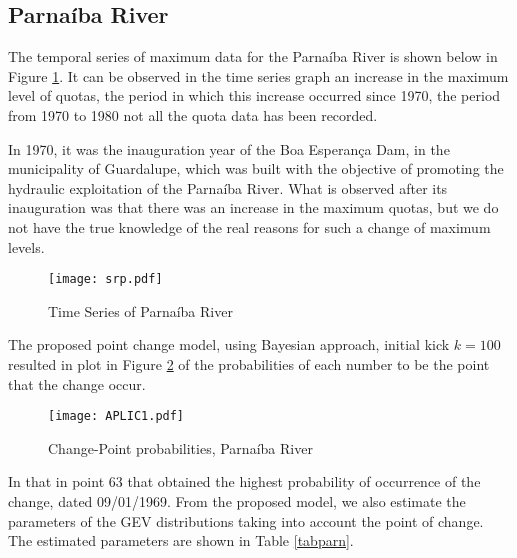 \documentclass{asaproc}
\begin{document}
\subsection{Parna\'iba River}

The temporal series of maximum data for the Parna\'iba River is shown below in Figure \ref{parn}. It can be observed in the time series graph an increase in the maximum level of quotas, the period in which this increase occurred since 1970, the period from 1970 to 1980 not all the quota data has been recorded.

In 1970, it was the inauguration year of the Boa Esperan\c{c}a Dam, in the municipality of Guardalupe, which was built with the objective of promoting the hydraulic exploitation of the Parna\'iba River. What is observed after its inauguration was that there was an increase in the maximum quotas, but we do not have the true knowledge of the real reasons for such a change of maximum levels.

\begin{figure}[H]
\centering
\texttt{[image: srp.pdf]}   
\caption{Time Series of Parna\'iba River}
\label{parn}
\end{figure}

The proposed point change model, using Bayesian approach, initial kick $k = 100$ resulted in plot in Figure \ref{ch-parn} of the probabilities of each number to be the point that the change occur.

\begin{figure}[H]
\centering
\texttt{[image: APLIC1.pdf]}   
\caption{Change-Point probabilities, Parna\'iba River}
\label{ch-parn}
\end{figure}

In that in point $63$ that obtained the highest probability of occurrence of the change, dated 09/01/1969. From the proposed model, we also estimate the parameters of the GEV distributions taking into account the point of change. The estimated parameters are shown in Table \ref{tabparn}.
\end{document}
